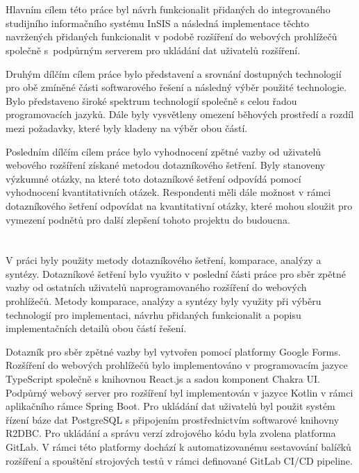 \section*{\CilPrace}

Hlavním cílem této práce byl návrh funkcionalit přidaných do integrovaného studijního informačního systému InSIS a následná implementace těchto navržených přidaných funkcionalit v podobě rozšíření do webových prohlížečů společně s~podpůrným serverem pro ukládání dat uživatelů rozšíření. 

Druhým dílčím cílem práce bylo představení a srovnání dostupných technologií pro obě zmíněné části softwarového řešení a následný výběr použité technologie. Bylo představeno široké spektrum technologií společně s celou řadou programovacích jazyků. Dále byly vysvětleny omezení běhových prostředí a rozdíl mezi požadavky, které byly kladeny na výběr obou částí.  

Posledním dílčím cílem práce bylo vyhodnocení zpětné vazby od uživatelů webového rozšíření získané metodou dotazníkového šetření. Byly stanoveny výzkumné otázky, na které toto dotazníkové šetření odpovídá pomocí vyhodnocení kvantitativních otázek. Respondenti měli dále možnost v rámci dotazníkového šetření odpovídat na kvantitativní otázky, které mohou sloužit pro vymezení podnětů pro další zlepšení tohoto projektu do budoucna. 

\section*{\PouziteMetody}

V práci byly použity metody dotazníkového šetření, komparace, analýzy a syntézy. Dotazníkové šetření bylo využito v poslední části práce pro sběr zpětné vazby od ostatních uživatelů naprogramovaného rozšíření do webových prohlížečů. Metody komparace, analýzy a syntézy byly využity při výběru technologií pro implementaci, návrhu přidaných funkcionalit a popisu implementačních detailů obou částí řešení.    

Dotazník pro sběr zpětné vazby byl vytvořen pomocí platformy Google Forms. Rozšíření do webových prohlížečů bylo implementováno v programovacím jazyce TypeScript společně s knihovnou React.js a sadou komponent Chakra UI. Podpůrný webový server pro rozšíření byl implementován v jazyce Kotlin v rámci aplikačního rámce Spring Boot. Pro ukládání dat uživatelů byl použit systém řízení báze dat PostgreSQL s připojením prostřednictvím softwarové knihovny R2DBC. Pro ukládání a správu verzí zdrojového kódu byla zvolena platforma GitLab. V rámci této platformy dochází k automatizovanému sestavování balíčků rozšíření a spouštění strojových testů v rámci definované GitLab CI/CD pipeline.

